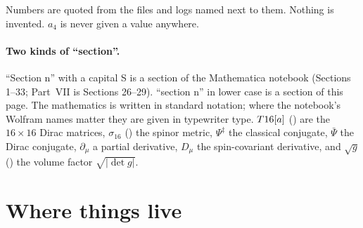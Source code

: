 Numbers are quoted from the files and logs named next to them. Nothing is invented. $a_4$ is never
given a value anywhere.

\paragraph{Two kinds of ``section''.} ``Section n'' with a capital S is a section of the Mathematica
notebook (Sections 1--33; Part~VII is Sections 26--29). ``section n'' in lower case is a section of
this page. The mathematics is written in standard notation; where the notebook's Wolfram names
matter they are given in typewriter type. $T16[a]$ () are the $16\times16$ Dirac
matrices, $\sigma_{16}$ () the spinor metric, $\Psi^{\ddagger}$ the classical
conjugate, $\bar\Psi$ the Dirac conjugate, $\partial_\mu$ a partial derivative, $D_\mu$ the
spin-covariant derivative, and $\sqrt g$ () the volume factor $\sqrt{|\det g|}$.

\tableofcontents

\section*{Where things live}
\label{sec:where}

